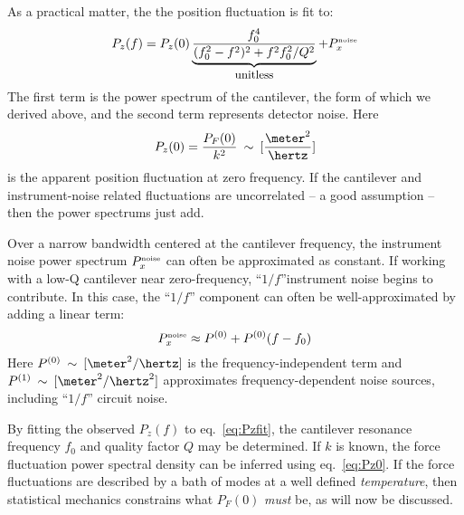 \label{sect:analyzing-data}

As a practical matter, the the position fluctuation is fit to:
\begin{equation}
P_z(f) = P_z(0) \underbrace{\frac{f_0^4}{(f_0^2 - f^2)^2 + f^2 f_0^2 / Q^2}}_{\mbox{\small unitless}} + P_x^{\mbox{\tiny noise}}
\label{eq:Pzfit}
\end{equation}
The first term is the power spectrum of the cantilever, the form of
which we derived above, and the second term represents detector noise.
Here
\begin{equation}
P_z(0) = \frac{P_F(0)}{k^2} \: \sim \: [\frac{\meter^2}{\hertz}]
\label{eq:Pz0}
\end{equation}
is the apparent position fluctuation at zero frequency.  If the
cantilever and instrument-noise related fluctuations are uncorrelated
-- a good assumption -- then the power spectrums just add.

Over a narrow bandwidth centered at the cantilever frequency, the
instrument noise power spectrum $P_x^{\mbox{\tiny noise}}$ can often
be approximated as constant.  If working with a low-Q cantilever near
zero-frequency, ``$1/f$''instrument noise begins to contribute.  In
this case, the ``$1/f$'' component can often be well-approximated by adding
a linear term:
\begin{equation}
P_x^{\mbox{\tiny noise}} \approx P^{(0)} + P^{(0)} (f - f_0)
\end{equation}
Here $P^{(0)} \: \sim \: [\meter^2/\hertz]$ is the
frequency-independent term and $P^{(1)} \: \sim \:
[\meter^2/\hertz^2]$ approximates frequency-dependent noise sources,
including ``$1/f$'' circuit noise.

By fitting the observed $P_z(f)$ to eq.~\ref{eq:Pzfit}, the cantilever
resonance frequency $f_0$ and quality factor $Q$ may be determined.  If
$k$ is known, the force fluctuation power spectral density can be
inferred using eq.~\ref{eq:Pz0}.  If the force fluctuations are
described by a bath of modes at a well defined \emph{temperature},
then statistical mechanics constrains what $P_F(0)$ \emph{must} be, as will
now be discussed.


\label{sect:equipartition-theorem}

